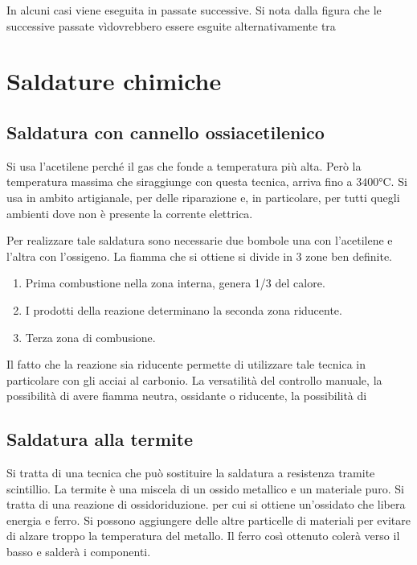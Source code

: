 In alcuni casi viene eseguita in passate successive.
Si nota dalla figura  che le successive passate vìdovrebbero essere esguite alternativamente tra 

\section{Saldature chimiche}
\subsection{Saldatura con cannello ossiacetilenico}
Si usa l'acetilene perché il gas che fonde a temperatura più alta.
Però la temperatura massima che siraggiunge con questa tecnica, arriva fino a $3400\unit{\celsius}$. Si usa in ambito artigianale, per delle riparazione e, in particolare, per tutti quegli ambienti dove non è presente la corrente elettrica.

Per realizzare tale saldatura sono necessarie due bombole una con l'acetilene e l'altra con l'ossigeno.
La fiamma che si ottiene si divide in 3 zone ben definite.
\begin{enumerate}
\item Prima combustione nella zona interna, genera 1/3 del calore.
\item I prodotti della reazione determinano la seconda zona riducente.
\item Terza zona di combusione.
\end{enumerate}

Il fatto che la reazione sia riducente permette di utilizzare tale tecnica in particolare con gli acciai al carbonio.
La versatilità del controllo manuale, la possibilità di avere fiamma neutra, ossidante o riducente, la possibilità di \moretodo{\\aggiungi}



\subsection{Saldatura alla termite}
Si tratta di una tecnica che può sostituire la saldatura a resistenza tramite scintillio.
La termite è una miscela di un ossido metallico e un materiale puro.
Si tratta di una reazione di ossidoriduzione. per cui si ottiene un'ossidato che libera energia e ferro. Si possono aggiungere delle altre particelle di materiali per evitare di alzare troppo la temperatura del metallo.
Il ferro così ottenuto colerà verso il basso e salderà i componenti.

